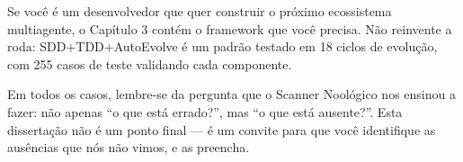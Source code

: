 Se você é um desenvolvedor que quer construir o próximo ecossistema multiagente, o Capítulo 3 contém o framework que você precisa. Não reinvente a roda: SDD+TDD+AutoEvolve é um padrão testado em 18 ciclos de evolução, com 255 casos de teste validando cada componente.

Em todos os casos, lembre-se da pergunta que o Scanner Noológico nos ensinou a fazer: não apenas ``o que está errado?'', mas ``o que está ausente?''. Esta dissertação não é um ponto final — é um convite para que você identifique as ausências que nós não vimos, e as preencha.

\newpage

